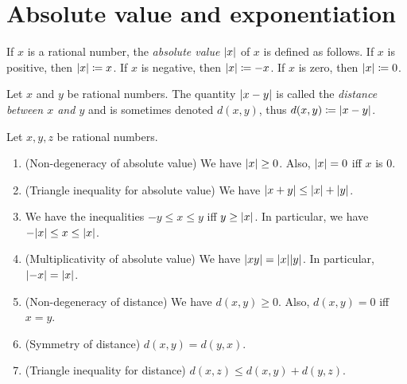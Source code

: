 \section{Absolute value and exponentiation}\label{i:sec:4.3}

\begin{defn}\label{i:4.3.1}
  If \(x\) is a rational number, the \emph{absolute value} \(\left\lvert x\right\rvert\) of \(x\) is defined as follows.
  If \(x\) is positive, then \(\left\lvert x\right\rvert \coloneqq x\).
  If \(x\) is negative, then \(\left\lvert x\right\rvert \coloneqq -x\).
  If \(x\) is zero, then \(\left\lvert x\right\rvert \coloneqq 0\).
\end{defn}

\begin{defn}[Distance]\label{i:4.3.2}
  Let \(x\) and \(y\) be rational numbers.
  The quantity \(\left\lvert x - y\right\rvert\) is called the \emph{distance between \(x\) and \(y\)} and is sometimes denoted \(d(x, y)\), thus \(d(x, y) \coloneqq \left\lvert x - y\right\rvert\).
\end{defn}

\begin{prop}\label{i:4.3.3}
  Let \(x, y, z\) be rational numbers.
  \begin{enumerate}
    \item (Non-degeneracy of absolute value)
          We have \(\left\lvert x\right\rvert \geq 0\).
          Also, \(\left\lvert x\right\rvert = 0\) iff \(x\) is \(0\).
    \item (Triangle inequality for absolute value)
          We have \(\left\lvert x + y\right\rvert \leq \left\lvert x\right\rvert + \left\lvert y\right\rvert\).
    \item We have the inequalities \(-y \leq x \leq y\) iff \(y \geq \left\lvert x\right\rvert\).
          In particular, we have \(-\abs{x} \leq x \leq \abs{x}\).
    \item (Multiplicativity of absolute value)
          We have \(\abs{xy} = \abs{x} \abs{y}\).
          In particular, \(\left\lvert-x\right\rvert = \left\lvert x\right\rvert\).
    \item (Non-degeneracy of distance)
          We have \(d(x, y) \geq 0\).
          Also, \(d(x, y) = 0\) iff \(x = y\).
    \item (Symmetry of distance)
          \(d(x, y) = d(y, x)\).
    \item (Triangle inequality for distance)
          \(d(x, z) \leq d(x, y) + d(y, z)\).
  \end{enumerate}
\end{prop}

